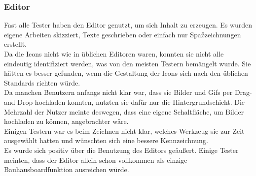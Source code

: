 \subsubsection{Editor}\label{Editor}
Fast alle Tester haben den Editor genutzt, um sich Inhalt zu erzeugen.
Es wurden eigene Arbeiten skizziert, Texte geschrieben oder einfach nur Spaßzeichnungen erstellt.
\\
Da die Icons nicht wie in üblichen Editoren waren, konnten sie nicht alle eindeutig identifiziert werden, was von den meisten Testern bemängelt wurde.
Sie hätten es besser gefunden, wenn die Gestaltung der Icons sich nach den üblichen Standards richten würde.
\\
Da manchen Benutzern anfangs nicht klar war, dass sie Bilder und Gifs per Drag-and-Drop hochladen konnten, nutzten sie dafür nur die Hintergrundschicht.
Die Mehrzahl der Nutzer meinte deswegen, dass eine eigene Schaltfläche, um Bilder hochladen zu können, angebrachter wäre.
\\
Einigen Testern war es beim Zeichnen nicht klar, welches Werkzeug sie zur Zeit ausgewählt hatten und wünschten sich eine bessere Kennzeichnung.
\\
Es wurde sich positiv über die Benutzung des Editors geäußert.
Einige Tester meinten, dass der Editor allein schon vollkommen als einzige Bauhausboardfunktion ausreichen würde.




